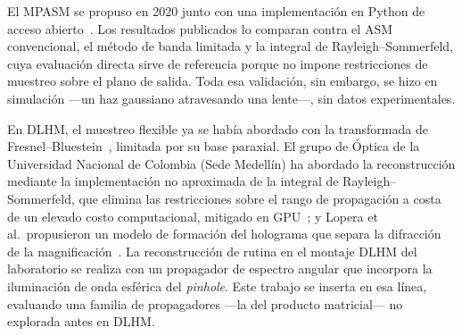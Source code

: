 El MPASM se propuso en 2020 junto con una implementación en Python de acceso
abierto~\cite{zhao2020, zhao2020code}. Los resultados publicados lo comparan
contra el ASM convencional, el método de banda limitada y la integral de
Rayleigh--Sommerfeld, cuya evaluación directa sirve de referencia porque no
impone restricciones de muestreo sobre el plano de salida. Toda esa
validación, sin embargo, se hizo en simulación ---un haz gaussiano atravesando
una lente---, sin datos experimentales.

En DLHM, el muestreo flexible ya se había abordado con la transformada de
Fresnel--Bluestein~\cite{restrepo2011}, limitada por su base paraxial. El
grupo de Óptica de la Universidad Nacional de Colombia (Sede Medellín) ha
abordado la reconstrucción mediante la implementación no aproximada de la
integral de Rayleigh--Sommerfeld, que elimina las restricciones sobre el rango
de propagación a costa de un elevado costo computacional, mitigado en
GPU~\cite{buitrago2019}; y Lopera et al.\ propusieron un modelo de formación
del holograma que separa la difracción de la magnificación~\cite{lopera2024}.
La reconstrucción de rutina en el montaje DLHM del laboratorio se realiza con
un propagador de espectro angular que incorpora la iluminación de onda
esférica del \emph{pinhole}. Este trabajo se inserta en esa línea, evaluando
una familia de propagadores ---la del producto matricial--- no explorada antes
en DLHM.
